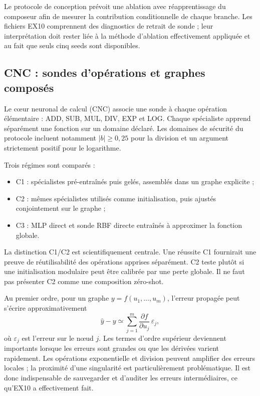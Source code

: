 \documentclass[11pt,a4paper]{article}
\begin{document}
Le protocole de conception prévoit une ablation avec réapprentissage du composeur afin de mesurer la contribution conditionnelle de chaque branche. Les fichiers EX10 comprennent des diagnostics de retrait de sonde ; leur interprétation doit rester liée à la méthode d'ablation effectivement appliquée et au fait que seuls cinq seeds sont disponibles.

\subsection{CNC : sondes d'opérations et graphes composés}

Le cœur neuronal de calcul (CNC) associe une sonde à chaque opération élémentaire : ADD, SUB, MUL, DIV, EXP et LOG. Chaque spécialiste apprend séparément une fonction sur un domaine déclaré. Les domaines de sécurité du protocole incluent notamment \(|b|\geq0{,}25\) pour la division et un argument strictement positif pour le logarithme.

Trois régimes sont comparés :
\begin{itemize}
  \item C1 : spécialistes pré-entraînés puis gelés, assemblés dans un graphe explicite ;
  \item C2 : mêmes spécialistes utilisés comme initialisation, puis ajustés conjointement sur le graphe ;
  \item C3 : MLP direct et sonde RBF directe entraînés à approximer la fonction globale.
\end{itemize}

La distinction C1/C2 est scientifiquement centrale. Une réussite C1 fournirait une preuve de réutilisabilité des opérations apprises séparément. C2 teste plutôt si une initialisation modulaire peut être calibrée par une perte globale. Il ne faut pas présenter C2 comme une composition zéro-shot.

Au premier ordre, pour un graphe \(y=f(u_1,\ldots,u_m)\), l'erreur propagée peut s'écrire approximativement
\[
\widehat y-y\simeq\sum_{j=1}^{m}
\frac{\partial f}{\partial u_j}\,\varepsilon_j,
\]
où \(\varepsilon_j\) est l'erreur sur le nœud \(j\). Les termes d'ordre supérieur deviennent importants lorsque les erreurs sont grandes ou que les dérivées varient rapidement. Les opérations exponentielle et division peuvent amplifier des erreurs locales ; la proximité d'une singularité est particulièrement problématique. Il est donc indispensable de sauvegarder et d'auditer les erreurs intermédiaires, ce qu'EX10 a effectivement fait.
\end{document}
